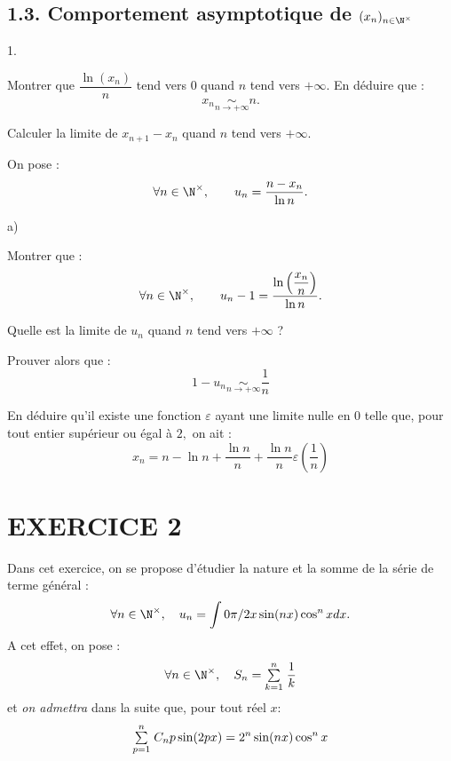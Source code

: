 \documentclass[11pt]{article}%
\begin{document}
\subsection*{1.3. Comportement asymptotique de $(x_{n})_{n\in
\N^{\times }}$}

\begin{noliste}{1.}
 \setlength{\itemsep}{4mm}
\item Montrer que $\dfrac{\ln (x_{n})}{n}$ tend vers $0$ quand $n$ tend
vers 
$ + \infty.$ En déduire que :
\[
x_{n}\underset{n\rightarrow + \infty }{\sim }n.
\]

\item Calculer la limite de $x_{n + 1}-x_{n}$ quand $n$ tend vers $ +
\infty.$

\item On pose :
\[
\forall n\in \N^{\times },\qquad u_{n} = \dfrac{n-x_{n}}{\ln n}.
\]

\begin{noliste}{a)}
 \setlength{\itemsep}{2mm}
\item Montrer que :
\[
\forall n\in \N^{\times },\qquad u_{n}-1 = \dfrac{\ln \left(
\dfrac{x_{n}}{n}\right) }{\ln n}.
\]

\item Quelle est la limite de $u_{n}$ quand $n$ tend vers $ + \infty $
?

\item Prouver alors que :
\[
1-u_{n}\underset{n\rightarrow + \infty }{\sim }\dfrac{1}{n}
\]
\end{noliste}

\item En déduire qu'il existe une fonction $\varepsilon $ ayant une
limite
nulle en $0$ telle que, pour tout entier supérieur ou égal à $2,$ on
ait :
\[
x_{n} = n-\ln n + \dfrac{\ln n}{n} + \dfrac{\ln n}{n}\varepsilon
(\dfrac{1}{n})
\]
\end{noliste}

\section*{EXERCICE 2}

Dans cet exercice, on se propose d'étudier la nature et la somme de la
série
de terme général :
\[
\forall n\in \N^{\times },\quad u_{n} = \dint{0}{\pi /2}x\sin
(nx)\cos ^{n}xdx.
\]
A cet effet, on pose :
\[
\forall n\in \N^{\times },\quad S_{n} = \Sum{k = 1}{n}\dfrac{1}{k}
\]
et \textit{on admettra} dans la suite que, pour tout réel $x :$
\[
{\textstyle\sum\limits_{p = 1}^{n}}\hspace{.1cm}C_{n}{p}\sin (2px) = 2^{n}\sin (nx)\cos ^{n}x
\]
\end{document}
